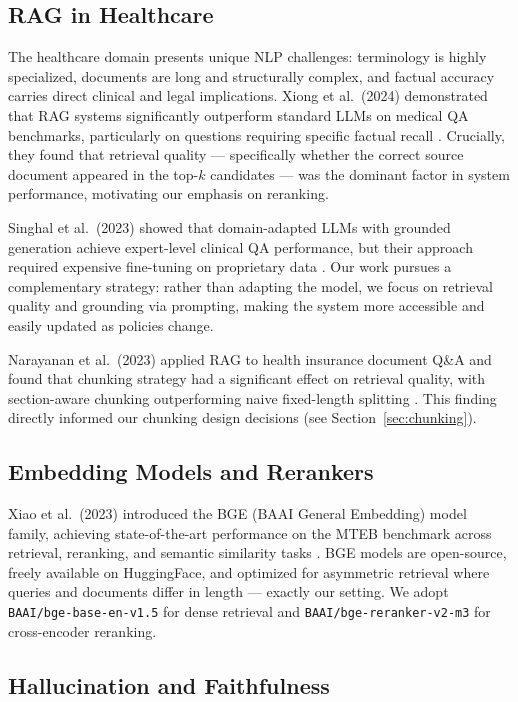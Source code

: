 \documentclass[10pt, letterpaper]{article}
\begin{document}
\subsection{RAG in Healthcare}
 
The healthcare domain presents unique NLP challenges: terminology is highly specialized,
documents are long and structurally complex, and factual accuracy carries direct clinical
and legal implications. Xiong et al.\ (2024) demonstrated that RAG systems significantly
outperform standard LLMs on medical QA benchmarks, particularly on questions requiring
specific factual recall \cite{xiong2024}. Crucially, they found that retrieval quality ---
specifically whether the correct source document appeared in the top-$k$ candidates ---
was the dominant factor in system performance, motivating our emphasis on reranking.
 
Singhal et al.\ (2023) showed that domain-adapted LLMs with grounded generation achieve
expert-level clinical QA performance, but their approach required expensive fine-tuning
on proprietary data \cite{singhal2023medpalm}. Our work pursues a complementary strategy:
rather than adapting the model, we focus on retrieval quality and grounding via prompting,
making the system more accessible and easily updated as policies change.
 
Narayanan et al.\ (2023) applied RAG to health insurance document Q\&A and found that
chunking strategy had a significant effect on retrieval quality, with section-aware chunking
outperforming naive fixed-length splitting \cite{narayanan2023insurance}. This finding
directly informed our chunking design decisions (see Section~\ref{sec:chunking}).
 
\subsection{Embedding Models and Rerankers}
 
Xiao et al.\ (2023) introduced the BGE (BAAI General Embedding) model family, achieving
state-of-the-art performance on the MTEB benchmark across retrieval, reranking, and
semantic similarity tasks \cite{xiao2023bge}. BGE models are open-source, freely
available on HuggingFace, and optimized for asymmetric retrieval where queries and
documents differ in length --- exactly our setting. We adopt \texttt{BAAI/bge-base-en-v1.5}
for dense retrieval and \texttt{BAAI/bge-reranker-v2-m3} for cross-encoder reranking.
 
\subsection{Hallucination and Faithfulness}
 
\end{document}
